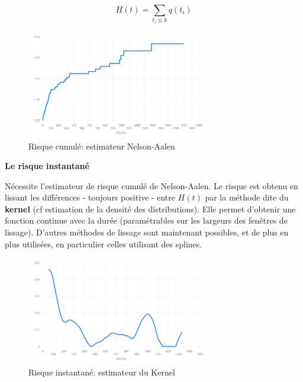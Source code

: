 \documentclass[
  12pt,
  letterpaper,
  DIV=11,
  numbers=noendperiod,
  onepage,
  openany]{scrreprt}
\begin{document}
\[H(t)=\sum_{t_i\leq k}q(t_i)\]

\begin{figure}

\caption{Risque cumulé: estimateur Nelson-Aalen}

{\centering \includegraphics[width=0.7\textwidth,height=\textheight]{images/Image19.png}

}

\end{figure}

\textbf{Le risque instantané}

Nécessite l'estimateur de risque cumulé de Nelson-Aalen. Le risque est
obtenu en lissant les différences - toujours positive - entre \(H(t)\)
par la méthode dite du \textbf{kernel} (cf estimation de la densité des
distributions). Elle permet d'obtenir une fonction continue avec la
durée (paramétrables sur les largeurs des fenêtres de lissage). D'autres
méthodes de lissage sont maintenant possibles, et de plus en plus
utilisées, en particulier celles utilisant des splines.

\begin{figure}

\caption{Risque instantané: estimateur du Kernel}

{\centering \includegraphics[width=0.7\textwidth,height=\textheight]{images/Image20.png}

}

\end{figure}
\end{document}
